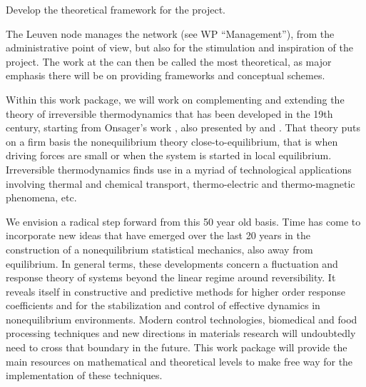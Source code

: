 \begin{workpackage}[id=WPcore,wphases=0-48,
  short=Gen. Theory, %
  title=General Theory, %
  lead=KUL,
  KULRM=36,UNIPDRM=6]

\newrefsection

\begin{wpobjectives}
\begin{compactitem}
\item Develop the theoretical framework for the project.
\end{compactitem}
\end{wpobjectives}

\begin{wpdescription}

The Leuven node manages the network (see WP ``Management''), from the administrative point
of view, but also for the stimulation and inspiration of the project. The work at the 
can then be called the most theoretical, as major emphasis there will be on
providing frameworks and conceptual schemes.

Within this work package, we will work on complementing and extending the theory of
irreversible thermodynamics that has been developed in the 19th century, starting from
Onsager's work \cite{onsager1,onsager2}, also presented by \cite{degrootmazur} and \cite{kubo}.
%
That theory puts on a firm basis the nonequilibrium theory close-to-equilibrium, that is
when driving forces are small or when the system is started in local equilibrium.
%
Irreversible thermodynamics finds use in a myriad of technological applications involving
thermal and chemical transport, thermo-electric and thermo-magnetic phenomena, etc.

We envision a radical step forward from this 50 year old basis. Time has come to incorporate
new ideas that have emerged over the last 20 years in the construction of a nonequilibrium
statistical mechanics, also away from equilibrium.
%
In general terms, these developments concern a fluctuation and response theory of systems
beyond the linear regime around reversibility. It reveals itself in constructive and
predictive methods for higher order response coefficients and for the stabilization and
control of effective dynamics in nonequilibrium environments.
%
Modern control technologies, biomedical and food processing techniques and new directions in
materials research will undoubtedly need to cross that boundary in the future. This
work package will provide the main resources on mathematical and theoretical levels to make
free way for the implementation of these techniques.


\end{wpdescription}
\end{workpackage}
